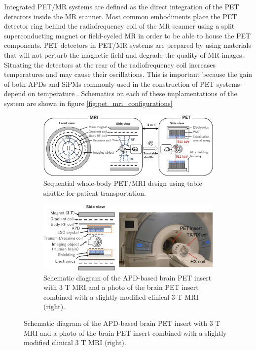 \documentclass[11pt]{article} %
\begin{document}
\begin{multicols}{2}
Integrated PET/MR systems are defined as the direct integration of the PET detectors inside the MR scanner. Most common embodiments place the PET detector ring behind the radiofrequency coil of the MR scanner using a split superconducting magnet or field-cycled MR in order to be able to house the PET components. PET detectors in PET/MR systems are prepared by using materials that will not perturb the magnetic field and degrade the quality of MR images. Situating the detectors at the rear of the radiofrequency coil increases temperatures and may cause their oscillations. This is important because the gain of both APDs and SiPMs-commonly used in the construction of PET systems-depend on temperature \cite{ziegler2013,Muzic2014}. Schematics on each of these implamentations of the system are shown in figure \ref{fig:pet_mri_configurations}

\begin{figure}[H]
	\centering
	\begin{subfigure}[b]{0.45\textwidth}
		\centering
		\includegraphics[width=\textwidth]{assets/sequencial.png}
		\caption{Sequential whole-body PET/MRI design using table shuttle for patient transportation.}
		\label{fig:sequential}
	\end{subfigure}
	\begin{subfigure}[b]{0.45\textwidth}
		\centering
		\includegraphics[width=\textwidth]{assets/insert.png}
		\caption{Schematic diagram of the APD-based brain PET insert with 3 T MRI and a photo of the brain PET insert combined with a slightly modified clinical 3 T MRI (right).}
		\label{fig:insert}
	\end{subfigure}
	

\end{figure}
\end{multicols}
\end{document}
